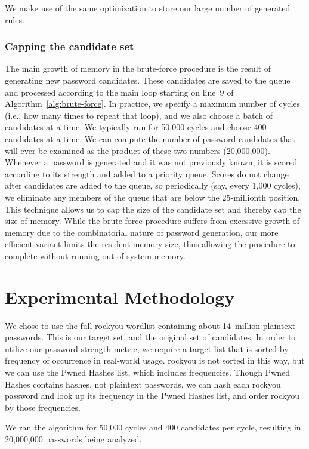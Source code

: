 \documentclass[letterpaper,twocolumn,10pt]{article}
\begin{document}
We make use of the same optimization to store our large number of generated rules.

\subsubsection{Capping the candidate set}

The main growth of memory in the brute-force procedure is the result of
generating new password candidates. These candidates are saved to the queue and
processed according to the main loop starting on line~9 of
Algorithm~\ref{alg:brute-force}. In practice, we specify a maximum number of
cycles (i.e., how many times to repeat that loop), and we also choose a batch
of candidates at a time. We typically run for 50,000 cycles and choose 400
candidates at a time. We can compute the number of password candidates that
will ever be examined as the product of these two numbers (20,000,000).
Whenever a password is generated and it was not previously known, it is scored
according to its strength and added to a priority queue. Scores do not change
after candidates are added to the queue, so periodically (say, every 1,000
cycles), we eliminate any members of the queue that are below the 25-millionth
position. This technique allows us to cap the size of the candidate set and
thereby cap the size of memory. While the brute-force procedure suffers from
excessive growth of memory due to the combinatorial nature of password
generation, our more efficient variant limits the resident memory size, thus
allowing the procedure to complete without running out of system memory.

\section{Experimental Methodology}

We chose to use the full rockyou wordlist containing about 14~million plaintext
passwords. This is our target set, and the original set of candidates. In order
to utilize our password strength metric, we require a target list that is
sorted by frequency of occurrence in real-world usage. rockyou is not sorted in
this way, but we can use the Pwned Hashes list, which includes frequencies.
Though Pwned Hashes contains hashes, not plaintext passwords, we can hash each
rockyou password and look up its frequency in the Pwned Hashes list, and order
rockyou by those frequencies.

We ran the algorithm for 50,000 cycles and 400 candidates per cycle, resulting
in 20,000,000 passwords being analyzed.
\end{document}
